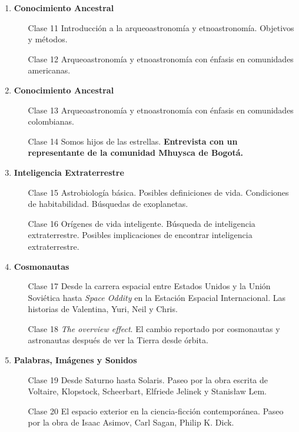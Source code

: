 \documentclass{report}
\begin{document}
\begin{enumerate}
\item {\bf Conocimiento Ancestral}
\begin{itemize}
\item[Clase 11] Introducci\'on a la arqueoastronom\'ia y
  etnoastronom\'ia. Objetivos y m\'etodos. 
\item[Clase 12] Arqueoastronom\'ia y etnoastronom\'ia con \'enfasis en
  comunidades americanas.
\end{itemize}

\item {\bf Conocimiento Ancestral}
\begin{itemize}
\item[Clase 13] Arqueoastronom\'ia y etnoastronom\'ia con \'enfasis en
  comunidades colombianas.
\item[Clase 14] Somos hijos de las estrellas. {\bf Entrevista con un
  representante de la comunidad Mhuysca de Bogot\'a.} 
\end{itemize}

\item {\bf Inteligencia Extraterrestre}
\begin{itemize}
\item[Clase 15] Astrobiolog\'ia b\'asica. Posibles definiciones de
  vida. Condiciones de habitabilidad. B\'usquedas de exoplanetas.
\item[Clase 16] Or\'igenes de vida inteligente.  B\'usqueda de
  inteligencia extraterrestre. Posibles implicaciones de encontrar
  inteligencia extraterrestre.
\end{itemize}

\item {\bf Cosmonautas}
\begin{itemize}
\item[Clase 17] Desde la carrera espacial entre Estados Unidos y la Uni\'on
  Sovi\'etica hasta \emph{Space Oddity} en la Estaci\'on Espacial
  Internacional. Las historias de Valentina, Yuri, Neil y Chris.
\item[Clase 18] \emph{The overview effect}. El cambio reportado por
  cosmonautas y astronautas despu\'es de ver la Tierra desde \'orbita.
\end{itemize}

\item {\bf Palabras, Im\'agenes y Sonidos}
\begin{itemize}
\item[Clase 19] Desde Saturno hasta Solaris. Paseo por la obra escrita
  de Voltaire, Klopstock, Scheerbart, Elfriede Jelinek y Stanis\l aw Lem.
\item[Clase 20] El espacio exterior en la ciencia-ficci\'on
  contempor\'anea. Paseo por la obra de Isaac Asimov, Carl Sagan, Philip K. Dick.
\end{itemize}


\end{enumerate}
\end{document}
